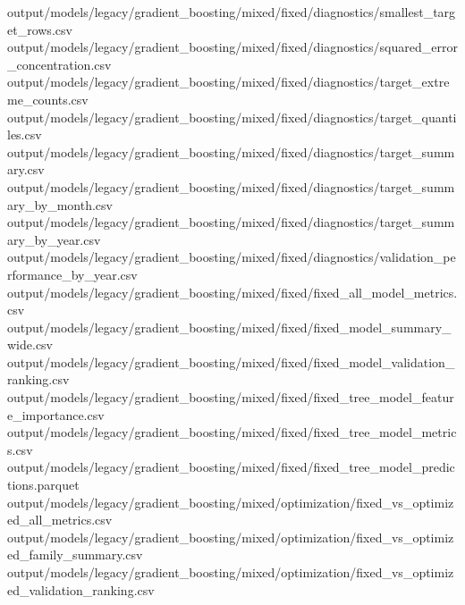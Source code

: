 \documentclass[
  11pt,
  a4paper]{article}
\newenvironment{Shaded}{}{}
\newcommand{\NormalTok}[1]{#1}
\begin{document}
\begin{Shaded}
\begin{Highlighting}[]
\NormalTok{output/models/legacy/gradient\_\allowbreak{}boosting/mixed/fixed/diagnostics/smallest\_\allowbreak{}target\_\allowbreak{}rows.csv}
\NormalTok{output/models/legacy/gradient\_\allowbreak{}boosting/mixed/fixed/diagnostics/squared\_\allowbreak{}error\_\allowbreak{}concentration.csv}
\NormalTok{output/models/legacy/gradient\_\allowbreak{}boosting/mixed/fixed/diagnostics/target\_\allowbreak{}extreme\_\allowbreak{}counts.csv}
\NormalTok{output/models/legacy/gradient\_\allowbreak{}boosting/mixed/fixed/diagnostics/target\_\allowbreak{}quantiles.csv}
\NormalTok{output/models/legacy/gradient\_\allowbreak{}boosting/mixed/fixed/diagnostics/target\_\allowbreak{}summary.csv}
\NormalTok{output/models/legacy/gradient\_\allowbreak{}boosting/mixed/fixed/diagnostics/target\_\allowbreak{}summary\_\allowbreak{}by\_\allowbreak{}month.csv}
\NormalTok{output/models/legacy/gradient\_\allowbreak{}boosting/mixed/fixed/diagnostics/target\_\allowbreak{}summary\_\allowbreak{}by\_\allowbreak{}year.csv}
\NormalTok{output/models/legacy/gradient\_\allowbreak{}boosting/mixed/fixed/diagnostics/validation\_\allowbreak{}performance\_\allowbreak{}by\_\allowbreak{}year.csv}
\NormalTok{output/models/legacy/gradient\_\allowbreak{}boosting/mixed/fixed/fixed\_\allowbreak{}all\_\allowbreak{}model\_\allowbreak{}metrics.csv}
\NormalTok{output/models/legacy/gradient\_\allowbreak{}boosting/mixed/fixed/fixed\_\allowbreak{}model\_\allowbreak{}summary\_\allowbreak{}wide.csv}
\NormalTok{output/models/legacy/gradient\_\allowbreak{}boosting/mixed/fixed/fixed\_\allowbreak{}model\_\allowbreak{}validation\_\allowbreak{}ranking.csv}
\NormalTok{output/models/legacy/gradient\_\allowbreak{}boosting/mixed/fixed/fixed\_\allowbreak{}tree\_\allowbreak{}model\_\allowbreak{}feature\_\allowbreak{}importance.csv}
\NormalTok{output/models/legacy/gradient\_\allowbreak{}boosting/mixed/fixed/fixed\_\allowbreak{}tree\_\allowbreak{}model\_\allowbreak{}metrics.csv}
\NormalTok{output/models/legacy/gradient\_\allowbreak{}boosting/mixed/fixed/fixed\_\allowbreak{}tree\_\allowbreak{}model\_\allowbreak{}predictions.parquet}
\NormalTok{output/models/legacy/gradient\_\allowbreak{}boosting/mixed/optimization/fixed\_\allowbreak{}vs\_\allowbreak{}optimized\_\allowbreak{}all\_\allowbreak{}metrics.csv}
\NormalTok{output/models/legacy/gradient\_\allowbreak{}boosting/mixed/optimization/fixed\_\allowbreak{}vs\_\allowbreak{}optimized\_\allowbreak{}family\_\allowbreak{}summary.csv}
\NormalTok{output/models/legacy/gradient\_\allowbreak{}boosting/mixed/optimization/fixed\_\allowbreak{}vs\_\allowbreak{}optimized\_\allowbreak{}validation\_\allowbreak{}ranking.csv}

\end{Highlighting}
\end{Shaded}
\end{document}
